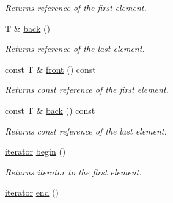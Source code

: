 \begin{DoxyCompactItemize}
\begin{DoxyCompactList}\small\item\em Returns reference of the first element. \end{DoxyCompactList}\item 
T \& \hyperlink{classtasks_1_1Vector_a31799a129da8e5ffc338b81997e888f1}{back} ()\hypertarget{classtasks_1_1Vector_a31799a129da8e5ffc338b81997e888f1}{}\label{classtasks_1_1Vector_a31799a129da8e5ffc338b81997e888f1}

\begin{DoxyCompactList}\small\item\em Returns reference of the last element. \end{DoxyCompactList}\item 
const T \& \hyperlink{classtasks_1_1Vector_a06b93542624827544f028424428e62a7}{front} () const \hypertarget{classtasks_1_1Vector_a06b93542624827544f028424428e62a7}{}\label{classtasks_1_1Vector_a06b93542624827544f028424428e62a7}

\begin{DoxyCompactList}\small\item\em Returns const reference of the first element. \end{DoxyCompactList}\item 
const T \& \hyperlink{classtasks_1_1Vector_a1262ae5b5ae53f6ba24ab73690da2772}{back} () const \hypertarget{classtasks_1_1Vector_a1262ae5b5ae53f6ba24ab73690da2772}{}\label{classtasks_1_1Vector_a1262ae5b5ae53f6ba24ab73690da2772}

\begin{DoxyCompactList}\small\item\em Returns const reference of the last element. \end{DoxyCompactList}\item 
\hyperlink{classtasks_1_1Vector_1_1Iterator}{iterator} \hyperlink{classtasks_1_1Vector_a47df3152b1f47c9d51c88f81e72f9e93}{begin} ()\hypertarget{classtasks_1_1Vector_a47df3152b1f47c9d51c88f81e72f9e93}{}\label{classtasks_1_1Vector_a47df3152b1f47c9d51c88f81e72f9e93}

\begin{DoxyCompactList}\small\item\em Returns iterator to the first element. \end{DoxyCompactList}\item 
\hyperlink{classtasks_1_1Vector_1_1Iterator}{iterator} \hyperlink{classtasks_1_1Vector_aa1cdd80b036883962279ab77dc1e725c}{end} ()\hypertarget{classtasks_1_1Vector_aa1cdd80b036883962279ab77dc1e725c}{}\label{classtasks_1_1Vector_aa1cdd80b036883962279ab77dc1e725c}


\end{DoxyCompactItemize}
